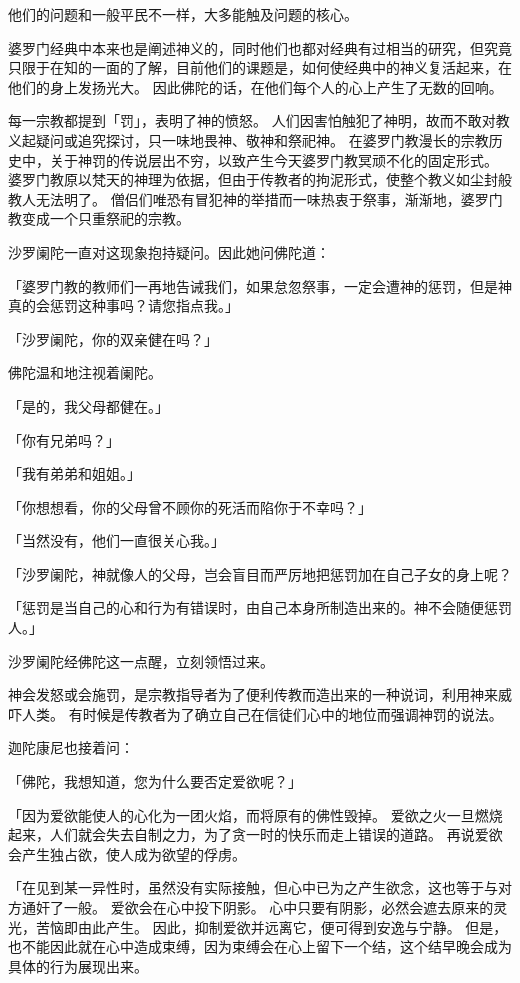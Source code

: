 \documentclass[twoside,openany]{book}
\begin{document}
他们的问题和一般平民不一样，大多能触及问题的核心。

婆罗门经典中本来也是阐述神义的，同时他们也都对经典有过相当的研究，但究竟只限于在知的一面的了解，目前他们的课题是，如何使经典中的神义复活起来，在他们的身上发扬光大。
因此佛陀的话，在他们每个人的心上产生了无数的回响。

每一宗教都提到「罚」，表明了神的愤怒。
人们因害怕触犯了神明，故而不敢对教义起疑问或追究探讨，只一味地畏神、敬神和祭祀神。
在婆罗门教漫长的宗教历史中，关于神罚的传说层出不穷，以致产生今天婆罗门教冥顽不化的固定形式。
婆罗门教原以梵天的神理为依据，但由于传教者的拘泥形式，使整个教义如尘封般教人无法明了。
僧侣们唯恐有冒犯神的举措而一味热衷于祭事，渐渐地，婆罗门教变成一个只重祭祀的宗教。

沙罗阑陀一直对这现象抱持疑问。因此她问佛陀道：

「婆罗门教的教师们一再地告诫我们，如果怠忽祭事，一定会遭神的惩罚，但是神真的会惩罚这种事吗？请您指点我。」

「沙罗阑陀，你的双亲健在吗？」

佛陀温和地注视着阑陀。

「是的，我父母都健在。」

「你有兄弟吗？」

「我有弟弟和姐姐。」

「你想想看，你的父母曾不顾你的死活而陷你于不幸吗？」

「当然没有，他们一直很关心我。」

「沙罗阑陀，神就像人的父母，岂会盲目而严厉地把惩罚加在自己子女的身上呢？

「惩罚是当自己的心和行为有错误时，由自己本身所制造出来的。神不会随便惩罚人。」

沙罗阑陀经佛陀这一点醒，立刻领悟过来。

神会发怒或会施罚，是宗教指导者为了便利传教而造出来的一种说词，利用神来威吓人类。
有时候是传教者为了确立自己在信徒们心中的地位而强调神罚的说法。

迦陀康尼也接着问：

「佛陀，我想知道，您为什么要否定爱欲呢？」

「因为爱欲能使人的心化为一团火焰，而将原有的佛性毁掉。
爱欲之火一旦燃烧起来，人们就会失去自制之力，为了贪一时的快乐而走上错误的道路。
再说爱欲会产生独占欲，使人成为欲望的俘虏。

「在见到某一异性时，虽然没有实际接触，但心中已为之产生欲念，这也等于与对方通奸了一般。
爱欲会在心中投下阴影。
心中只要有阴影，必然会遮去原来的灵光，苦恼即由此产生。
因此，抑制爱欲并远离它，便可得到安逸与宁静。
但是，也不能因此就在心中造成束缚，因为束缚会在心上留下一个结，这个结早晚会成为具体的行为展现出来。
\end{document}
